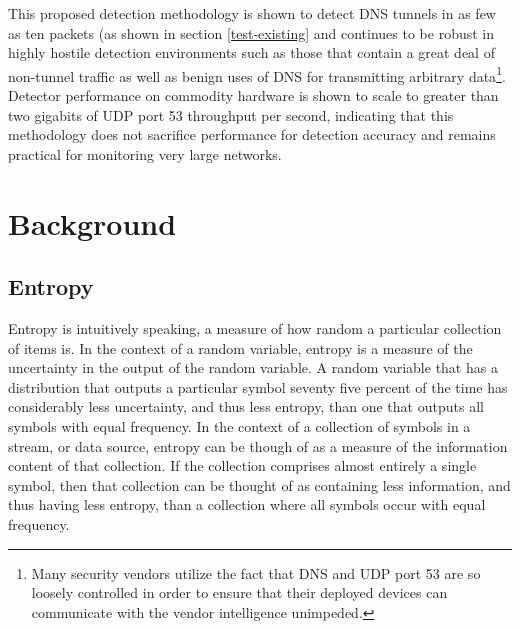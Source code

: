 \documentclass[12pt]{report}
\theoremstyle{remark}
\theoremstyle{definition}
\theoremstyle{definition}
\theoremstyle{definition}
\begin{document}
This proposed detection methodology is shown to detect DNS tunnels in as few as
ten packets (as shown in section \ref{test-existing} and continues to be robust
in highly hostile detection environments such as those that contain a great deal
of non-tunnel traffic as well as benign uses of DNS for transmitting arbitrary
data\footnote{Many security vendors utilize the fact that DNS and UDP port 53
are so loosely controlled in order to ensure that their deployed devices can
communicate with the vendor intelligence unimpeded.}. Detector performance on
commodity hardware is shown to scale to greater than two gigabits of UDP port 53
throughput per second, indicating that this methodology does not sacrifice
performance for detection accuracy and remains practical for monitoring very
large networks.

\newpage

\chapter{Background}

\section{Entropy}
Entropy\cite{WolframAlpha-EntropyWord}\cite{WolframAlpha-EntropyMath} is
intuitively speaking, a measure of how random a particular collection of items
is. In the context of a random variable, entropy is a measure of the uncertainty
in the output of the random variable. A random variable that has a distribution
that outputs a particular symbol seventy five percent of the time has
considerably less uncertainty, and thus less entropy, than one that outputs all
symbols with equal frequency. In the context of a collection of symbols in a
stream, or data source, entropy can be though of as a measure of the information
content of that collection. If the collection comprises almost entirely a single
symbol, then that collection can be thought of as containing less information,
and thus having less entropy, than a collection where all symbols occur with
equal frequency.
\end{document}
